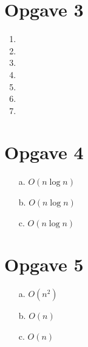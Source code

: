 \documentclass[12pt,a4paper]{article}
\begin{document}
\section{Opgave 3}
\begin{enumerate}
\item {}
\item {}
\item {}
\item {}
\item {}
\item {}
\item {}
\end{enumerate}

\section{Opgave 4}
\begin{itemize}
\item[a.] $O(n\log{n})$
\item[b.] $O(n\log{n})$
\item[c.] $O(n\log{n})$
\end{itemize}

\section{Opgave 5}
\begin{itemize}
\item[a.] $O(n^2)$
\item[b.] $O(n)$
\item[c.] $O(n)$
\end{itemize}
\end{document}
